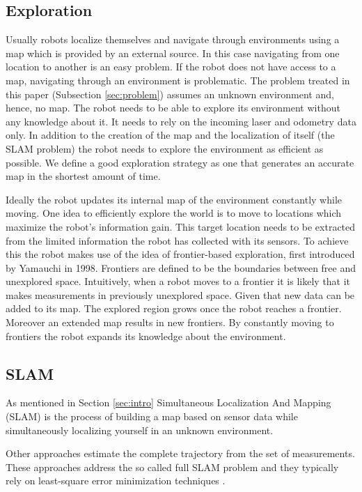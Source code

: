 \documentclass{ba-kecs}
\begin{document}
\subsection{Exploration}
\label{subsec:sotaExplore}
Usually robots localize themselves and navigate through environments using a map which is provided by an external source. In this case navigating from one location to another is an easy problem. If the robot does not have access to a map, navigating through an environment is problematic. The problem treated in this paper (Subsection \ref{sec:problem}) assumes an unknown environment and, hence, no map. The robot needs to be able to explore its environment without any knowledge about it. It needs to rely on the incoming laser and odometry data only. In addition to the creation of the map and the localization of itself (the SLAM problem) the robot needs to explore the environment as efficient as possible. We define a good exploration strategy as one that generates an accurate map in the shortest amount of time.

Ideally the robot updates its internal map of the environment constantly while moving. One idea to efficiently explore the world is to move to locations which maximize the robot's information gain. This target location needs to be extracted from the limited information the robot has collected with its sensors.
To achieve this the robot makes use of the idea of frontier-based exploration, first introduced by Yamauchi \cite{Yamauchi} in 1998. Frontiers are defined to be the boundaries between free and unexplored space. Intuitively, when a robot moves to a frontier it is likely that it makes measurements in previously unexplored space. Given that new data can be added to its map. The explored region grows once the robot reaches a frontier. Moreover an extended map results in new frontiers. By constantly moving to frontiers the robot expands its knowledge about the environment.

\subsection{SLAM}
\label{subsec:sotaSlam}
As mentioned in Section \ref{sec:intro} Simultaneous Localization And Mapping (SLAM) is the process of building a map based on sensor data while simultaneously localizing yourself in an unknown environment.

Other approaches estimate the complete trajectory from the set of measurements. These approaches address the so called full SLAM problem and they typically rely on least-square error minimization techniques \cite{Leastsquares}.
\end{document}
